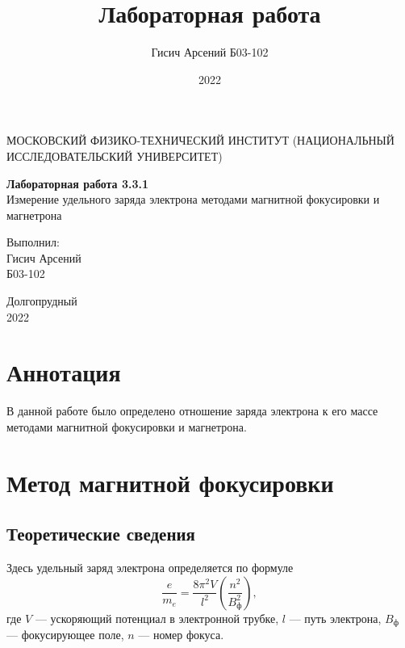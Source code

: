 \documentclass[a4paper, 12pt]{article}
\title{Лабораторная работа}
\author{Гисич Арсений Б03-102}
\date{2022}
\begin{document}
	\begin{center}
		{\large МОСКОВСКИЙ ФИЗИКО-ТЕХНИЧЕСКИЙ ИНСТИТУТ (НАЦИОНАЛЬНЫЙ ИССЛЕДОВАТЕЛЬСКИЙ УНИВЕРСИТЕТ)}
	\end{center}
	\vspace{5 cm}
	{\Large
		\begin{center}
			{\bf Лабораторная работа 3.3.1}\\[0.2 cm]
			Измерение удельного заряда электрона методами магнитной фокусировки и магнетрона
		\end{center}
	}
	\vspace{4 cm}
	\begin{flushright}
		{\Large Выполнил: \\
			\vspace{0.2 cm}
			Гисич Арсений \\
			\vspace{0.2 cm}
			Б03-102 \\}
	\end{flushright}
	\vspace{8 cm}
	\begin{center}
		Долгопрудный\\[0.1 cm]
		2022
	\end{center}
\thispagestyle{empty}

\section{Аннотация}

В данной работе было определено отношение заряда электрона к его массе методами магнитной фокусировки и магнетрона.

\section{Метод магнитной фокусировки}

\subsection{Теоретические сведения}

Здесь удельный заряд электрона определяется по формуле
\begin{equation}
\dfrac{e}{m_e} = \dfrac{8\pi^2V}{l^2} \left(\dfrac{n^2}{B_{\text{ф}}^2} \right),
\end{equation}
где $V$ --- ускоряющий потенциал в электронной трубке, $l$ --- путь электрона, $B_{\text{ф}}$ --- фокусирующее поле, $n$ --- номер фокуса.
\end{document}
